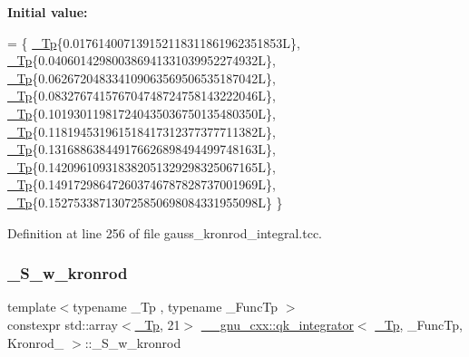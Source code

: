 {\bfseries Initial value\+:}
\begin{DoxyCode}
=
      \{
        \hyperlink{namespace____gnu__cxx_a3b19a9c800ca194374ef9172290f7d79}{\_Tp}\{0.017614007139152118311861962351853L\},
        \hyperlink{namespace____gnu__cxx_a3b19a9c800ca194374ef9172290f7d79}{\_Tp}\{0.040601429800386941331039952274932L\},
        \hyperlink{namespace____gnu__cxx_a3b19a9c800ca194374ef9172290f7d79}{\_Tp}\{0.062672048334109063569506535187042L\},
        \hyperlink{namespace____gnu__cxx_a3b19a9c800ca194374ef9172290f7d79}{\_Tp}\{0.083276741576704748724758143222046L\},
        \hyperlink{namespace____gnu__cxx_a3b19a9c800ca194374ef9172290f7d79}{\_Tp}\{0.101930119817240435036750135480350L\},
        \hyperlink{namespace____gnu__cxx_a3b19a9c800ca194374ef9172290f7d79}{\_Tp}\{0.118194531961518417312377377711382L\},
        \hyperlink{namespace____gnu__cxx_a3b19a9c800ca194374ef9172290f7d79}{\_Tp}\{0.131688638449176626898494499748163L\},
        \hyperlink{namespace____gnu__cxx_a3b19a9c800ca194374ef9172290f7d79}{\_Tp}\{0.142096109318382051329298325067165L\},
        \hyperlink{namespace____gnu__cxx_a3b19a9c800ca194374ef9172290f7d79}{\_Tp}\{0.149172986472603746787828737001969L\},
        \hyperlink{namespace____gnu__cxx_a3b19a9c800ca194374ef9172290f7d79}{\_Tp}\{0.152753387130725850698084331955098L\}
      \}
\end{DoxyCode}


Definition at line 256 of file gauss\+\_\+kronrod\+\_\+integral.\+tcc.

\mbox{\label{struct____gnu__cxx_1_1qk__integrator_3_01__Tp_00_01__FuncTp_00_01Kronrod__41_01_4_a0ca7d785bcc4ea62564da850f4349aa2}} 
\subsubsection{\texorpdfstring{\+\_\+\+S\+\_\+w\+\_\+kronrod}{\_S\_w\_kronrod}}
{\footnotesize\ttfamily template$<$typename \+\_\+\+Tp , typename \+\_\+\+Func\+Tp $>$ \\
constexpr std\+::array$<$\hyperlink{namespace____gnu__cxx_a3b19a9c800ca194374ef9172290f7d79}{\+\_\+\+Tp}, 21$>$ \hyperlink{class____gnu__cxx_1_1qk__integrator}{\+\_\+\+\_\+gnu\+\_\+cxx\+::qk\+\_\+integrator}$<$ \hyperlink{namespace____gnu__cxx_a3b19a9c800ca194374ef9172290f7d79}{\+\_\+\+Tp}, \+\_\+\+Func\+Tp, Kronrod\+\_ $>$\+::\+\_\+\+S\+\_\+w\+\_\+kronrod\hspace{0.3cm}{\ttfamily [static]}}

